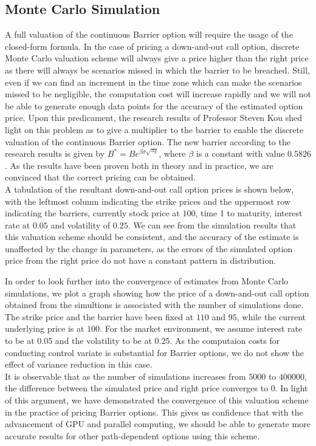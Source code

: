 \subsection*{Monte Carlo Simulation}
A full valuation of the continuous Barrier option will require the usage of the closed-form formula. In the case of pricing a down-and-out call option, discrete Monte Carlo valuation scheme will always give a price higher than the right price as there will always be scenarios missed in which the barrier to be breached. Still, even if we can find an increment in the time zone which can make the scenarios missed to be negligible, the computation cost will increase rapidly and we will not be able to generate enough data points for the accuracy of the estimated option price. Upon this predicament, the research results of Professor Steven Kou\cite{ContinuityCorrection} shed light on this problem as to give a multiplier to the barrier to enable the discrete valuation of the continuous Barrier option. The new barrier according to the research results is given by $B^{*} = Be^{\beta \sigma \sqrt{^{\Delta}t}}$, where $\beta$ is a constant with value $0.5826$. As the results have been proven both in theory and in practice, we are convinced that the correct pricing can be obtained.\\[1mm]
A tabulation of the resultant down-and-out call option prices is shown below, with the leftmost column indicating the strike prices and the uppermost row indicating the barriers, currently stock price at $100$, time 1 to maturity, interest rate at $0.05$ and volatility of $0.25$. 
We can see from the simulation results that this valuation scheme should be consistent, and the accuracy of the estimate is unaffected by the change in parameters, as the errors of the simulated option price from the right price do not have a constant pattern in distribution.

In order to look further into the convergence of estimates from Monte Carlo simulations, we plot a graph showing how the price of a down-and-out call option obtained from the simultions is associated with the number of simulations done. The strike price and the barrier have been fixed at $110$ and $95$, while the current underlying price is at $100$. For the market environment, we assume interest rate to be at $0.05$ and the volatility to be at $0.25$. As the computaion costs for conducting control variate is substantial for Barrier options, we do not show the effect of variance reduction in this case.
\\It is observable that as the number of simulations increases from $5000$ to $400000$, the difference between the simulated price and right price converges to 0. In light of this argument, we have demonstrated the convergence of this valuation scheme in the practice of pricing Barrier options. This gives us confidence that with the advancement of GPU and parallel computing, we should be able to generate more accurate results for other path-dependent options using this scheme.

